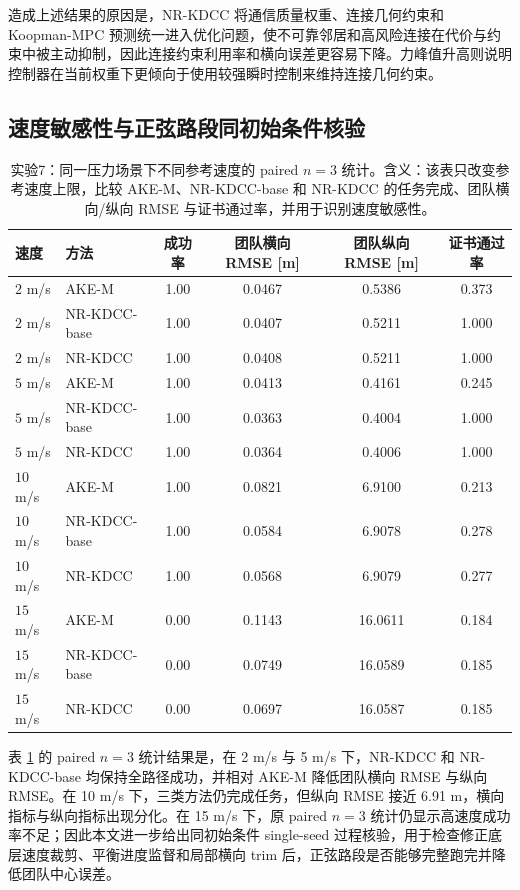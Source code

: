 \documentclass[twocolumn,3p,times,procedia]{elsarticle}
\newcommand{\AKE}{AKE-M}
\newcommand{\Method}{NR-KDCC}
\newcommand{\MethodBase}{NR-KDCC-base}
\begin{document}
造成上述结果的原因是，\Method{} 将通信质量权重、连接几何约束和 Koopman-MPC 预测统一进入优化问题，使不可靠邻居和高风险连接在代价与约束中被主动抑制，因此连接约束利用率和横向误差更容易下降。力峰值升高则说明控制器在当前权重下更倾向于使用较强瞬时控制来维持连接几何约束。

\subsection{速度敏感性与正弦路段同初始条件核验}

\begin{table}[!t]
\centering
\caption{实验7：同一压力场景下不同参考速度的 paired $n=3$ 统计。含义：该表只改变参考速度上限，比较 \AKE{}、\MethodBase{} 和 \Method{} 的任务完成、团队横向/纵向 RMSE 与证书通过率，并用于识别速度敏感性。}
\label{tab:speed_sensitivity}
\footnotesize
\begin{tabular}{llcccc}
\toprule
速度 & 方法 & 成功率 & 团队横向 RMSE [m] & 团队纵向 RMSE [m] & 证书通过率 \\
\midrule
$2$ m/s & \AKE{} & 1.00 & 0.0467 & 0.5386 & 0.373\\
$2$ m/s & \MethodBase{} & 1.00 & 0.0407 & 0.5211 & 1.000\\
$2$ m/s & \Method{} & 1.00 & 0.0408 & 0.5211 & 1.000\\
$5$ m/s & \AKE{} & 1.00 & 0.0413 & 0.4161 & 0.245\\
$5$ m/s & \MethodBase{} & 1.00 & 0.0363 & 0.4004 & 1.000\\
$5$ m/s & \Method{} & 1.00 & 0.0364 & 0.4006 & 1.000\\
$10$ m/s & \AKE{} & 1.00 & 0.0821 & 6.9100 & 0.213\\
$10$ m/s & \MethodBase{} & 1.00 & 0.0584 & 6.9078 & 0.278\\
$10$ m/s & \Method{} & 1.00 & 0.0568 & 6.9079 & 0.277\\
$15$ m/s & \AKE{} & 0.00 & 0.1143 & 16.0611 & 0.184\\
$15$ m/s & \MethodBase{} & 0.00 & 0.0749 & 16.0589 & 0.185\\
$15$ m/s & \Method{} & 0.00 & 0.0697 & 16.0587 & 0.185\\
\bottomrule
\end{tabular}
\end{table}

表 \ref{tab:speed_sensitivity} 的 paired $n=3$ 统计结果是，在 2 m/s 与 5 m/s 下，\Method{} 和 \MethodBase{} 均保持全路径成功，并相对 \AKE{} 降低团队横向 RMSE 与纵向 RMSE。在 10 m/s 下，三类方法仍完成任务，但纵向 RMSE 接近 6.91 m，横向指标与纵向指标出现分化。在 15 m/s 下，原 paired $n=3$ 统计仍显示高速度成功率不足；因此本文进一步给出同初始条件 single-seed 过程核验，用于检查修正底层速度裁剪、平衡进度监督和局部横向 trim 后，正弦路段是否能够完整跑完并降低团队中心误差。
\end{document}
